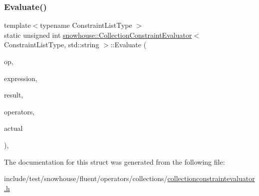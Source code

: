 \subsubsection{\texorpdfstring{Evaluate()}{Evaluate()}}
{\footnotesize\ttfamily template$<$typename Constraint\+List\+Type $>$ \\
static unsigned int \mbox{\hyperlink{structsnowhouse_1_1CollectionConstraintEvaluator}{snowhouse\+::\+Collection\+Constraint\+Evaluator}}$<$ Constraint\+List\+Type, std\+::string $>$\+::Evaluate (\begin{DoxyParamCaption}\item[{const \mbox{\hyperlink{structsnowhouse_1_1ConstraintOperator}{Constraint\+Operator}} \&}]{op,  }\item[{Constraint\+List\+Type \&}]{expression,  }\item[{\mbox{\hyperlink{namespacesnowhouse_a719169b1315a13161c15f25e600a8f51}{Result\+Stack}} \&}]{result,  }\item[{\mbox{\hyperlink{namespacesnowhouse_adcb10e215e6a4bbcb35722a9c7270fc6}{Operator\+Stack}} \&}]{operators,  }\item[{const std\+::string \&}]{actual }\end{DoxyParamCaption})\hspace{0.3cm}{\ttfamily [inline]}, {\ttfamily [static]}}



The documentation for this struct was generated from the following file\+:\begin{DoxyCompactItemize}
\item 
include/test/snowhouse/fluent/operators/collections/\mbox{\hyperlink{collectionconstraintevaluator_8h}{collectionconstraintevaluator.\+h}}\end{DoxyCompactItemize}
